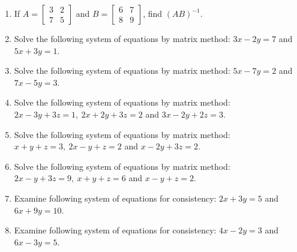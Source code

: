 \begin{enumerate}
\item If $A = \begin{bmatrix} 3 & 2 \\ 7 & 5 \end{bmatrix}$ and $B = \begin{bmatrix} 6 & 7 \\ 8 & 9 \end{bmatrix}$, find $(AB)^{-1}$.
\item Solve the following system of equations by matrix method: $3x - 2y = 7$ and $5x + 3y = 1$.
\item Solve the following system of equations by matrix method: $5x - 7y = 2$ and $7x -5y = 3$.
\item Solve the following system of equations by matrix method: $2x - 3y + 3z = 1,\ 2x + 2y + 3z = 2$ and $3x -2y + 2z = 3$.
\item Solve the following system of equations by matrix method: $x + y + z = 3,\ 2x - y + z = 2$ and $x - 2y + 3z = 2$.
\item Solve the following system of equations by matrix method: $2x - y + 3z = 9,\ x + y + z = 6$ and $x - y + z = 2$.
\item Examine following system of equations for consistency: $2x + 3y = 5$ and $6x + 9y = 10$.
\item Examine following system of equations for consistency: $4x - 2y = 3$ and $6x - 3y = 5$.
\end{enumerate}
